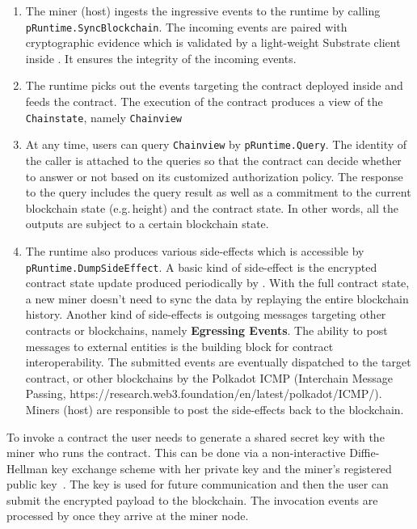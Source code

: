 \begin{enumerate}
    \item The miner (host) ingests the ingressive events to the runtime by calling \texttt{pRuntime.SyncBlockchain}. The incoming events are paired with cryptographic evidence which is validated by a light-weight Substrate client inside \pruntime. It ensures the integrity of the incoming events.
    \item The runtime picks out the events targeting the contract deployed inside and feeds the contract. The execution of the contract produces a view of the \texttt{Chainstate}, namely \texttt{Chainview}
    \item At any time, users can query \texttt{Chainview} by \texttt{pRuntime.Query}. The identity of the caller is attached to the queries so that the contract can decide whether to answer or not based on its customized authorization policy. The response to the query includes the query result as well as a commitment to the current blockchain state (e.g.\,height) and the contract state. In other words, all the outputs are subject to a certain blockchain state.
    \item The runtime also produces various side-effects which is accessible by \texttt{pRuntime.DumpSideEffect}. A basic kind of side-effect is the encrypted contract state update produced periodically by \pruntime. With the full contract state, a new miner doesn't need to sync the data by replaying the entire blockchain history. Another kind of side-effects is outgoing messages targeting other contracts or blockchains, namely \textbf{Egressing Events}. The ability to post messages to external entities is the building block for contract interoperability. The submitted events are eventually dispatched to the target contract, or other blockchains by the Polkadot ICMP (Interchain Message Passing, https://research.web3.foundation/en/latest/polkadot/ICMP/). Miners (host) are responsible to post the side-effects back to the blockchain.
\end{enumerate}

To invoke a contract the user needs to generate a shared secret key with the miner who runs the contract. This can be done via a non-interactive Diffie-Hellman key exchange scheme with her private key and the miner's registered public key~\cite{schindlerdistributed}. The key is used for future communication and then the user can submit the encrypted payload to the blockchain. The invocation events are processed by \pruntime once they arrive at the miner node.


